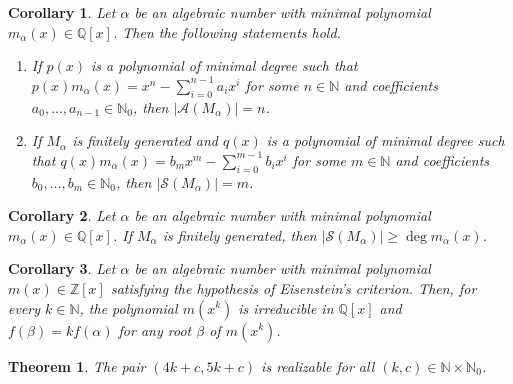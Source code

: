 \documentclass[10pt,a4paper]{amsart}
\newtheorem{corollary}{Corollary}
\newtheorem{theorem}{Theorem}
\newcommand{\N}{\mathbb{N}}
\newcommand{\nn}{\mathbb{N}}
\newcommand{\qq}{\mathbb{Q}}
\newcommand{\zz}{\mathbb{Z}}
\begin{document}
\begin{corollary}\label{cor:minimal poly condition for atoms}
    Let $\alpha$ be an algebraic number with minimal polynomial $m_\alpha(x) \in \qq[x]$. Then the following statements hold.
    \begin{enumerate}
        \item If $p(x)$ is a polynomial of minimal degree such that $p(x)m_\alpha(x) = x^n - \sum_{i=0}^{n-1} a_i x^i$ for some $n \in \N$ and coefficients $a_0, \dots, a_{n-1} \in \N_0$, then $|\mathcal{A}(M_\alpha)| = n$.
        \smallskip
        
        \item If $M_\alpha$ is finitely generated and $q(x)$ is a polynomial of minimal degree such that  $q(x)m_\alpha(x) = b_m x^m - \sum_{i=0}^{m-1} b_i x^i$ for some $m \in \N$ and coefficients $b_0, \dots, b_m \in \N_0$, then $|\mathcal{S}(M_\alpha)| = m$.
    \end{enumerate}
\end{corollary}

\begin{corollary}\label{cor:more strong atoms than degree}
    Let $\alpha$ be an algebraic number with minimal polynomial $m_\alpha(x) \in \qq[x]$. If $M_\alpha$ is finitely generated, then $|\mathcal{S}(M_\alpha)| \ge \deg m_\alpha(x)$.
\end{corollary}

\begin{corollary} \label{cor:multiple realizable if eisenstein}
    Let $\alpha$ be an algebraic number with minimal polynomial $m(x) \in \zz[x]$ satisfying the hypothesis of Eisenstein's criterion. Then, for every $k \in \nn$, the polynomial $m(x^k)$ is irreducible in $\qq[x]$ and $f(\beta) = kf(\alpha)$ for any root $\beta$ of $m(x^k)$.
\end{corollary}

\begin{theorem} \label{thm:4k_5k_realize}
    The pair $(4k+c,5k+c)$ is realizable for all $(k,c) \in \nn \times \nn_0$.
\end{theorem}
\end{document}
